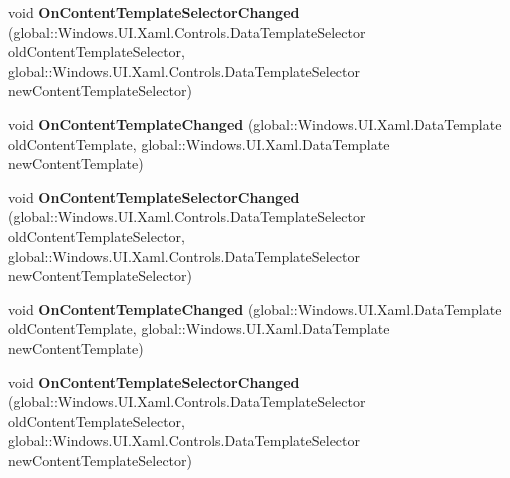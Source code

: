 \begin{DoxyCompactItemize}
void {\bfseries On\+Content\+Template\+Selector\+Changed} (global\+::\+Windows.\+U\+I.\+Xaml.\+Controls.\+Data\+Template\+Selector old\+Content\+Template\+Selector, global\+::\+Windows.\+U\+I.\+Xaml.\+Controls.\+Data\+Template\+Selector new\+Content\+Template\+Selector)
\item 
\mbox{\label{interface_windows_1_1_u_i_1_1_xaml_1_1_controls_1_1_i_content_presenter_overrides_ae8281d9b7f3dd003dfccb2720b1405d3}} 
void {\bfseries On\+Content\+Template\+Changed} (global\+::\+Windows.\+U\+I.\+Xaml.\+Data\+Template old\+Content\+Template, global\+::\+Windows.\+U\+I.\+Xaml.\+Data\+Template new\+Content\+Template)
\item 
\mbox{\label{interface_windows_1_1_u_i_1_1_xaml_1_1_controls_1_1_i_content_presenter_overrides_a87f3da45b7e3c94762174182d8c0e4bc}} 
void {\bfseries On\+Content\+Template\+Selector\+Changed} (global\+::\+Windows.\+U\+I.\+Xaml.\+Controls.\+Data\+Template\+Selector old\+Content\+Template\+Selector, global\+::\+Windows.\+U\+I.\+Xaml.\+Controls.\+Data\+Template\+Selector new\+Content\+Template\+Selector)
\item 
\mbox{\label{interface_windows_1_1_u_i_1_1_xaml_1_1_controls_1_1_i_content_presenter_overrides_ae8281d9b7f3dd003dfccb2720b1405d3}} 
void {\bfseries On\+Content\+Template\+Changed} (global\+::\+Windows.\+U\+I.\+Xaml.\+Data\+Template old\+Content\+Template, global\+::\+Windows.\+U\+I.\+Xaml.\+Data\+Template new\+Content\+Template)
\item 
\mbox{\label{interface_windows_1_1_u_i_1_1_xaml_1_1_controls_1_1_i_content_presenter_overrides_a87f3da45b7e3c94762174182d8c0e4bc}} 
void {\bfseries On\+Content\+Template\+Selector\+Changed} (global\+::\+Windows.\+U\+I.\+Xaml.\+Controls.\+Data\+Template\+Selector old\+Content\+Template\+Selector, global\+::\+Windows.\+U\+I.\+Xaml.\+Controls.\+Data\+Template\+Selector new\+Content\+Template\+Selector)
\item 
\mbox{\label{interface_windows_1_1_u_i_1_1_xaml_1_1_controls_1_1_i_content_presenter_overrides_ae8281d9b7f3dd003dfccb2720b1405d3}} 

\end{DoxyCompactItemize}
